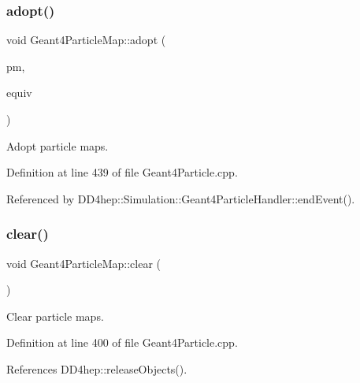 \subsubsection{\texorpdfstring{adopt()}{adopt()}}
{\footnotesize\ttfamily void Geant4\+Particle\+Map\+::adopt (\begin{DoxyParamCaption}\item[{\hyperlink{class_d_d4hep_1_1_simulation_1_1_geant4_particle_map_a065c5fb0629285022b9aa2a628bffef3}{Particle\+Map} \&}]{pm,  }\item[{\hyperlink{class_d_d4hep_1_1_simulation_1_1_geant4_particle_map_aba09f5fcb2dd5874d129660ad4454a21}{Track\+Equivalents} \&}]{equiv }\end{DoxyParamCaption})}



Adopt particle maps. 



Definition at line 439 of file Geant4\+Particle.\+cpp.



Referenced by D\+D4hep\+::\+Simulation\+::\+Geant4\+Particle\+Handler\+::end\+Event().

\hypertarget{class_d_d4hep_1_1_simulation_1_1_geant4_particle_map_a8a8ea52d779e40d4f41b369a8bc659fe}{}\label{class_d_d4hep_1_1_simulation_1_1_geant4_particle_map_a8a8ea52d779e40d4f41b369a8bc659fe} 
\subsubsection{\texorpdfstring{clear()}{clear()}}
{\footnotesize\ttfamily void Geant4\+Particle\+Map\+::clear (\begin{DoxyParamCaption}{ }\end{DoxyParamCaption})}



Clear particle maps. 



Definition at line 400 of file Geant4\+Particle.\+cpp.



References D\+D4hep\+::release\+Objects().

\hypertarget{class_d_d4hep_1_1_simulation_1_1_geant4_particle_map_af4b8e6d1e0511df8ef271411520cb1cc}{}\label{class_d_d4hep_1_1_simulation_1_1_geant4_particle_map_af4b8e6d1e0511df8ef271411520cb1cc} 
